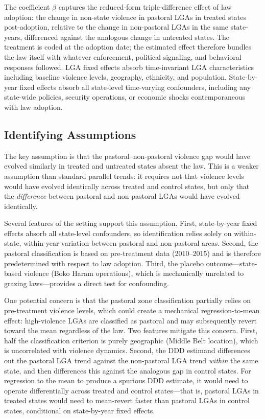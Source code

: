 \documentclass[12pt]{article}
\begin{document}
The coefficient $\beta$ captures the reduced-form triple-difference effect of law adoption: the change in non-state violence in pastoral LGAs in treated states post-adoption, relative to the change in non-pastoral LGAs in the same state-years, differenced against the analogous change in untreated states. The treatment is coded at the adoption date; the estimated effect therefore bundles the law itself with whatever enforcement, political signaling, and behavioral responses followed. LGA fixed effects absorb time-invariant LGA characteristics including baseline violence levels, geography, ethnicity, and population. State-by-year fixed effects absorb all state-level time-varying confounders, including any state-wide policies, security operations, or economic shocks contemporaneous with law adoption.

\subsection{Identifying Assumptions}

The key assumption is that the pastoral--non-pastoral violence gap would have evolved similarly in treated and untreated states absent the law. This is a weaker assumption than standard parallel trends: it requires not that violence levels would have evolved identically across treated and control states, but only that the \textit{difference} between pastoral and non-pastoral LGAs would have evolved identically.

Several features of the setting support this assumption. First, state-by-year fixed effects absorb all state-level confounders, so identification relies solely on within-state, within-year variation between pastoral and non-pastoral areas. Second, the pastoral classification is based on pre-treatment data (2010--2015) and is therefore predetermined with respect to law adoption. Third, the placebo outcome---state-based violence (Boko Haram operations), which is mechanically unrelated to grazing laws---provides a direct test for confounding.

One potential concern is that the pastoral zone classification partially relies on pre-treatment violence levels, which could create a mechanical regression-to-mean effect: high-violence LGAs are classified as pastoral and may subsequently revert toward the mean regardless of the law. Two features mitigate this concern. First, half the classification criterion is purely geographic (Middle Belt location), which is uncorrelated with violence dynamics. Second, the DDD estimand differences out the pastoral LGA trend against the non-pastoral LGA trend \textit{within} the same state, and then differences this against the analogous gap in control states. For regression to the mean to produce a spurious DDD estimate, it would need to operate differentially across treated and control states---that is, pastoral LGAs in treated states would need to mean-revert faster than pastoral LGAs in control states, conditional on state-by-year fixed effects.
\end{document}

